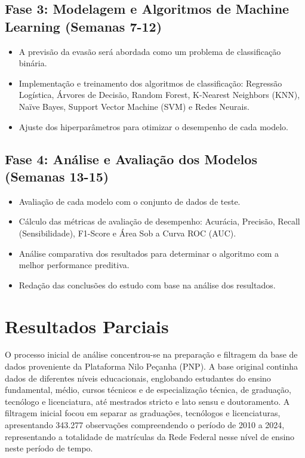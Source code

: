 \documentclass[english, spanish, brazilian]{RBIEarticle} %
\begin{document}
\subsection{Fase 3: Modelagem e Algoritmos de Machine Learning (Semanas 7-12)}

\begin{itemize}
    \item A previsão da evasão será abordada como um problema de classificação binária.
    \item Implementação e treinamento dos algoritmos de classificação: Regressão Logística, Árvores de Decisão, Random Forest, K-Nearest Neighbors (KNN), Naïve Bayes, Support Vector Machine (SVM) e Redes Neurais.
    \item Ajuste dos hiperparâmetros para otimizar o desempenho de cada modelo.
\end{itemize}


\subsection{Fase 4: Análise e Avaliação dos Modelos (Semanas 13-15)}

\begin{itemize}
    \item Avaliação de cada modelo com o conjunto de dados de teste.
    \item Cálculo das métricas de avaliação de desempenho: Acurácia, Precisão, Recall (Sensibilidade), F1-Score e Área Sob a Curva ROC (AUC).
    \item Análise comparativa dos resultados para determinar o algoritmo com a melhor performance preditiva.
    \item Redação das conclusões do estudo com base na análise dos resultados.
\end{itemize}


\section{Resultados Parciais}
O processo inicial de análise concentrou-se na preparação e filtragem da base de dados proveniente da Plataforma Nilo Peçanha (PNP). A base original continha dados de diferentes níveis educacionais, englobando estudantes do ensino fundamental, médio, cursos técnicos e de especialização técnica, de graduação, tecnólogo e licenciatura, até mestrados stricto e lato sensu e doutoramento. A filtragem inicial focou em separar as graduações, tecnólogos e licenciaturas, apresentando 343.277 observações compreendendo o período de 2010 a 2024, representando a totalidade de matrículas da Rede Federal nesse nível de ensino neste período de tempo.
\end{document}
